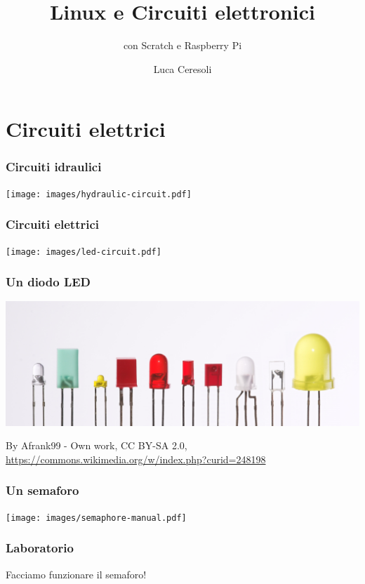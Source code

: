 \documentclass[xetex,table]{beamer}
\title{Linux e Circuiti elettronici}
\subtitle{con Scratch e Raspberry Pi}
\author{Luca Ceresoli}
\date{}
\begin{document}
\maketitle

\section{Circuiti elettrici}

\begin{frame}
  \frametitle{Circuiti idraulici}
  \begin{center}
    \texttt{[image: images/hydraulic-circuit.pdf]}
  \end{center}
\end{frame}

\begin{frame}
  \frametitle{Circuiti elettrici}
  \begin{center}
    \texttt{[image: images/led-circuit.pdf]}
  \end{center}
\end{frame}

\begin{frame}
  \frametitle{Un diodo LED}
  \includegraphics[width=\textwidth]{images/LEDs.jpg}

  {\tiny By Afrank99 - Own work, CC BY-SA 2.0,
    \url{https://commons.wikimedia.org/w/index.php?curid=248198}}
\end{frame}

\begin{frame}
  \frametitle{Un semaforo}
  \begin{center}
    \texttt{[image: images/semaphore-manual.pdf]}
  \end{center}
\end{frame}

\begin{frame}
  \frametitle{Laboratorio}
  \begin{center}
    \LARGE
    Facciamo funzionare il semaforo!
  \end{center}
\end{frame}
\end{document}
